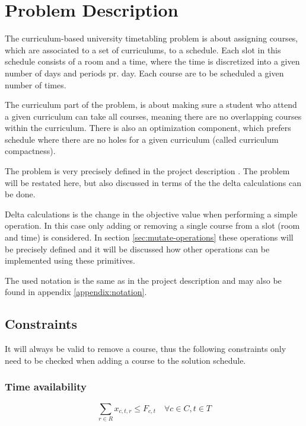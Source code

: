 \section{Problem Description}

The curriculum-based university timetabling problem is about assigning courses, which are associated to a set of curriculums, to a schedule. Each slot in this schedule consists of a room and a time, where the time is discretized into a given number of days and periods pr. day. Each course are to be scheduled a given number of times.

The curriculum part of the problem, is about making sure a student who attend a given curriculum can take all courses, meaning there are no overlapping courses within the  curriculum. There is also an optimization component, which prefers schedule where there are no holes for a given curriculum (called curriculum compactness).

The problem is very precisely defined in the project description \cite{assignment}. The problem will be restated here, but also discussed in terms of the the delta calculations can be done.

Delta calculations is the change in the objective value when performing a simple operation. In this case only adding or removing a single course from a slot (room and time) is considered. In section \ref{sec:mutate-operations} these operations will be precisely defined and it will be discussed how other operations can be implemented using these primitives.

The used notation is the same as in the project description \cite{assignment} and may also be found in appendix \ref{appendix:notation}.

\subsection{Constraints}

It will always be valid to remove a course, thus the following constraints only need to be checked when adding a course to the solution schedule.

\subsubsection{Time availability}
\begin{equation}
    \sum_{r \in R} x_{c, t, r} \le F_{c, t} \quad \forall c \in C, t \in T
\end{equation}

